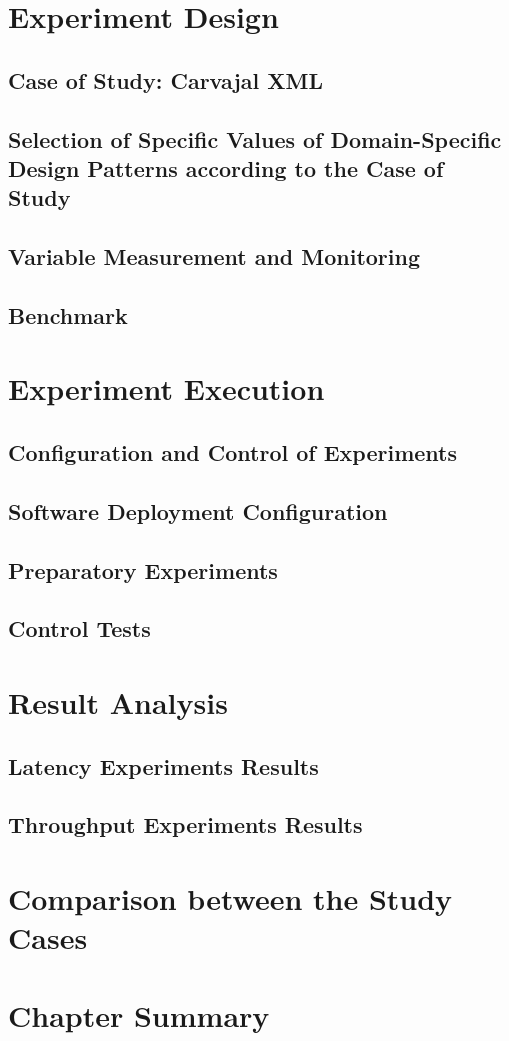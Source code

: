 \section{Experiment Design}
\subsection{Case of Study: Carvajal XML }

\subsection{Selection of Specific Values of Domain-Specific Design Patterns according to the Case of Study}

\subsection{Variable Measurement and Monitoring}

\subsection{Benchmark}

\section{Experiment Execution}

\subsection{Configuration and Control of Experiments}
\subsection{Software Deployment Configuration}
\subsection{Preparatory Experiments}
\subsection{Control Tests}

\section{Result Analysis}

\subsection{Latency Experiments Results}

\subsection{Throughput Experiments Results}

\section{Comparison between the Study Cases}


\section{Chapter Summary}